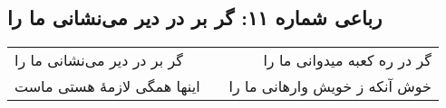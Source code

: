 \begin{center}
\section*{رباعی شماره ۱۱: گر بر در دیر می‌نشانی ما را}
\label{sec:sh011}
\begin{longtable}{l p{0.5cm} r}
گر بر در دیر می‌نشانی ما را
&&
گر در ره کعبه میدوانی ما را
\\
اینها همگی لازمهٔ هستی ماست
&&
خوش آنکه ز خویش وارهانی ما را
\\
\end{longtable}
\end{center}
